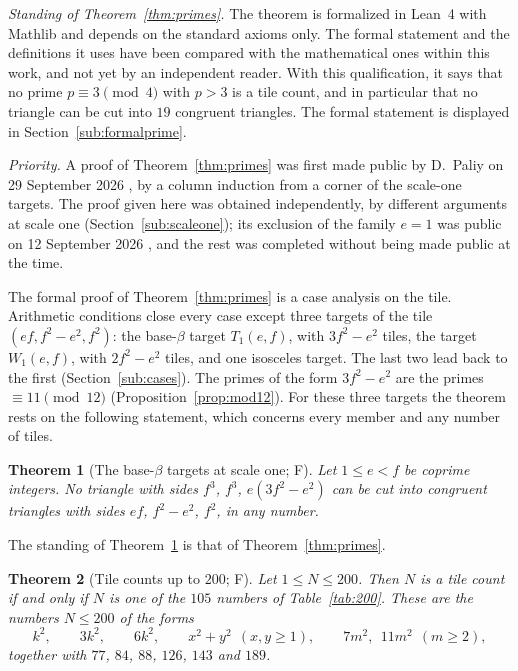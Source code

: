 \documentclass[11pt,reqno]{amsart}
\theoremstyle{plain}
\newtheorem{theorem}{Theorem}[section]
\theoremstyle{definition}
\newcommand{\sF}{\textup{\textsf{F}}}
\begin{document}
\noindent\emph{Standing of Theorem~\ref{thm:primes}.} The theorem is formalized in Lean~4 with Mathlib and
depends on the standard axioms only. The formal statement and the definitions it uses have been compared with
the mathematical ones within this work, and not yet by an independent reader. With this qualification, it says that no prime $p\equiv3\pmod4$ with $p>3$ is a tile count, and in particular that no triangle can be
cut into $19$ congruent triangles. The formal statement is displayed in Section~\ref{sub:formalprime}.

\noindent\emph{Priority.} A proof of Theorem~\ref{thm:primes} was first made public by D.~Paliy on 29
September 2026 \cite{PaliyPrime}, by a column induction from a corner of the scale-one targets. The proof given
here was obtained independently, by different arguments at scale one (Section~\ref{sub:scaleone}); its
exclusion of the family $e=1$ was public on 12 September 2026 \cite{Zenodo32}, and the rest was completed
without being made public at the time.

\medskip
The formal proof of Theorem~\ref{thm:primes} is a case analysis on the tile. Arithmetic conditions close
every case except three targets of the tile $(ef,f^2-e^2,f^2)$: the base-$\beta$ target $T_1(e,f)$, with $3f^2-e^2$
tiles, the target $W_1(e,f)$, with $2f^2-e^2$ tiles, and one isosceles target. The last two lead back to the
first (Section~\ref{sub:cases}). The primes of the form $3f^2-e^2$ are the primes $\equiv11\pmod{12}$
(Proposition~\ref{prop:mod12}). For these three targets the theorem rests on the following statement,
which concerns every member and any number of tiles.

\begin{theorem}[The base-$\beta$ targets at scale one; \sF]\label{thm:scaleone}
Let $1\le e<f$ be coprime integers. No triangle with sides $f^3$, $f^3$, $e(3f^2-e^2)$ can be cut into
congruent triangles with sides $ef$, $f^2-e^2$, $f^2$, in any number.
\end{theorem}

The standing of Theorem~\ref{thm:scaleone} is that of Theorem~\ref{thm:primes}.

\begin{theorem}[Tile counts up to $200$; \sF]\label{thm:200}
Let $1\le N\le200$. Then $N$ is a tile count if and only if $N$ is one of the $105$ numbers
of Table~\ref{tab:200}. These are the numbers $N\le200$ of the forms
\[
k^2,\qquad 3k^2,\qquad 6k^2,\qquad x^2+y^2\ \ (x,y\ge1),\qquad 7m^2,\ \ 11m^2\ \ (m\ge2),
\]
together with $77$, $84$, $88$, $126$, $143$ and $189$.
\end{theorem}
\end{document}
